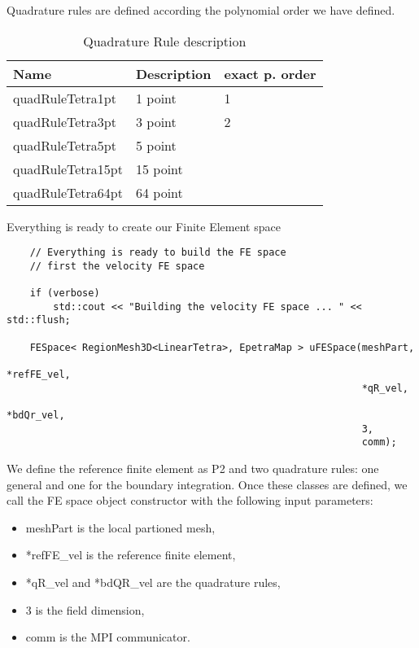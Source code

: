 Quadrature rules  are defined according the polynomial order we have defined.

\begin{table}
\begin{center}
\begin{tabular}{|l|l|l|}
\hline
Name  & Description & exact p. order\\
\hline \hline
quadRuleTetra1pt   & 1 point & 1 \\
quadRuleTetra3pt   & 3 point & 2 \\
quadRuleTetra5pt   & 5 point &   \\
quadRuleTetra15pt  & 15 point &  \\
quadRuleTetra64pt  & 64 point &  \\
\hline
\end{tabular}
\end{center}
\caption{ Quadrature Rule description}
\label{table-feapproxorder}
\end{table}

Everything is ready to create our Finite Element space

\begin{verbatim}
    // Everything is ready to build the FE space
    // first the velocity FE space

    if (verbose)
        std::cout << "Building the velocity FE space ... " << std::flush;

    FESpace< RegionMesh3D<LinearTetra>, EpetraMap > uFESpace(meshPart,
                                                             *refFE_vel,
                                                             *qR_vel,
                                                             *bdQr_vel,
                                                             3,
                                                             comm);

\end{verbatim}

We define the reference finite element as P2 and two quadrature rules: one general and one
for the boundary integration. Once these classes are defined, we call the FE space
object constructor with the following input parameters:
\begin{itemize}
\item meshPart is the local partioned mesh,
\item *refFE\_vel is the reference finite element,
\item *qR\_vel and *bdQR\_vel are the quadrature rules,
\item 3 is the field dimension,
\item comm is the MPI communicator.
\end{itemize}

